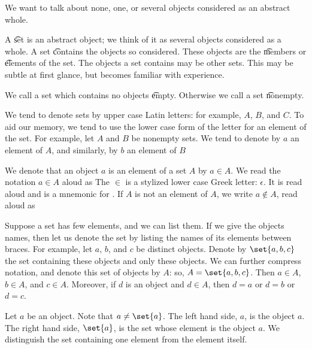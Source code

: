 
\sbasic


\sstart
{}


We want to talk about none, one, or several objects considered as an abstract whole.


A \t{set} is an abstract object; we think of it as several objects considered as a whole.
A set \t{contains} the objects so considered.
These objects are the \t{members} or \t{elements} of the set.
The objects a set contains may be other sets.
This may be subtle at first glance, but becomes familiar with experience.

We call a set which contains no objects \t{empty}.
Otherwise we call a set \t{nonempty}.



We tend to denote sets by upper case Latin letters: for example, $A$, $B$, and $C$.
To aid our memory, we tend to use the lower case form of the letter for an element of the set.
For example, let $A$ and $B$ be nonempty sets.
We tend to denote by $a$ an element of $A$, and similarly, by $b$ an element of $B$

We denote that an object $a$ is an element of a set $A$ by $a \in A$.
We read the notation $a \in A$ aloud as 
The $\in$ is a stylized lower case Greek letter: $\epsilon$.
It is read aloud  and is a mnemonic for .
If $A$ is not an element of $A$, we write $a \not\in A$, read aloud as 

Suppose a set has few elements, and we can list them.
If we give the objects names, then let us denote the set by listing the names of its elements between braces.
For example, let $a$, $b$, and $c$ be distinct objects.
Denote by $\set{a, b, c}$ the set containing these objects and only these objects.
We can further compress notation, and denote this set of objects by $A$: so, $A = \set{a, b, c}$.
Then $a \in A$, $b \in A$, and $c \in A$.
Moreover, if $d$ is an object and $d \in A$, then $d = a$ or $d = b$ or $d = c$.

Let $a$ be an object.
Note that $a \neq \set{a}$.
The left hand side, $a$, is the object $a$.
The right hand side, $\set{a}$, is the set whose element is the object $a$.
We distinguish the set containing one element from the element itself.


\strats

